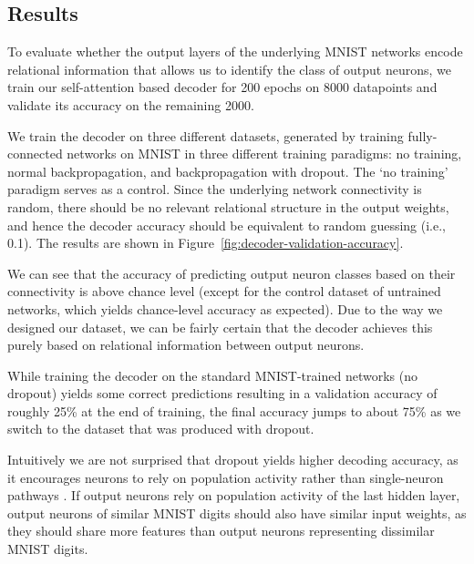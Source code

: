 \documentclass[11pt]{article}
\begin{document}
\subsection{Results}

To evaluate whether the output layers of the underlying MNIST networks encode relational information that allows us to identify the class of output neurons, we train our self-attention based decoder for 200 epochs on 8000 datapoints and validate its accuracy on the remaining 2000.

We train the decoder on three different datasets, generated by training fully-connected networks on MNIST in three different training paradigms: no training, normal backpropagation, and backpropagation with dropout. The `no training' paradigm serves as a control. Since the underlying network connectivity is random, there should be no relevant relational structure in the output weights, and hence the decoder accuracy should be equivalent to random guessing (i.e., 0.1). The results are shown in Figure~\ref{fig:decoder-validation-accuracy}.

We can see that the accuracy of predicting output neuron classes based on their connectivity is above chance level (except for the control dataset of untrained networks, which yields chance-level accuracy as expected). Due to the way we designed our dataset, we can be fairly certain that the decoder achieves this purely based on relational information between output neurons.

While training the decoder on the standard MNIST-trained networks (no dropout) yields some correct predictions resulting in a validation accuracy of roughly 25\% at the end of training, the final accuracy jumps to about 75\% as we switch to the dataset that was produced with dropout.

Intuitively we are not surprised that dropout yields higher decoding accuracy, as it encourages neurons to rely on population activity rather than single-neuron pathways \cite{baldi2013}. If output neurons rely on population activity of the last hidden layer, output neurons of similar MNIST digits should also have similar input weights, as they should share more features than output neurons representing dissimilar MNIST digits.
\end{document}
